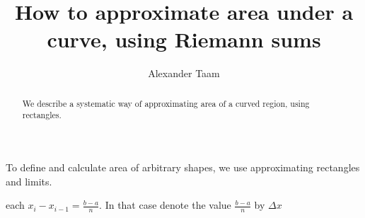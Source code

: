 \documentclass{ximera}
\title{How to approximate area under a curve, using Riemann sums}
\author{Alexander Taam}
\begin{document}
\begin{abstract}
  We describe a systematic way of approximating area of a curved region, using rectangles.
\end{abstract}
\maketitle

To define and calculate area of arbitrary shapes, we use approximating rectangles and limits.

\begin{definition}\label{def:partition}
\begin{foldable}
\begin{foldable}
 each $x_i-x_{i-1}=\frac{b-a}{n}$. In that case denote the value $\frac{b-a}{n}$ by $\Delta x$
\end{foldable}
\end{foldable}
\end{definition}
\end{document}
